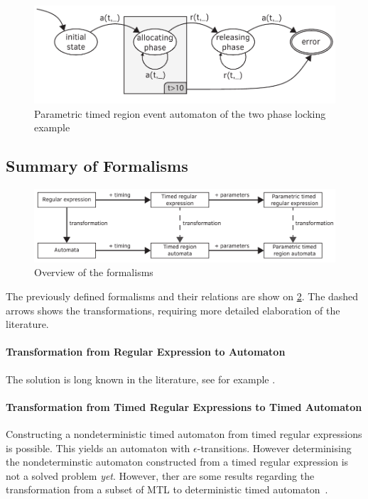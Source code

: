 			\begin{figure}[h]
			\centering
			\includegraphics[width=0.7\linewidth]{figures/chapter_4/allocating_timed_parametric}
			\caption{Parametric timed region event automaton of the two phase locking example \redraw}
			\label{fig:cep:ptrea}
			\end{figure}

	\subsection{Summary of Formalisms}

	\begin{figure}[h]
	\centering
	\includegraphics[width=0.95\linewidth]{figures/chapter_4/folyamatabra}
	\caption{Overview of the formalisms \redraw}
	\label{fig:cep:folyamatabra}
	\end{figure}

	The previously defined formalisms and their relations are show on \cref{fig:cep:folyamatabra}.
	The dashed arrows shows the transformations, requiring more detailed elaboration of the literature.

	\paragraph{Transformation from Regular Expression to Automaton}
	The solution is long known in the literature, see for example \citep{lam2006compilers}.

	\paragraph{Transformation from Timed Regular Expressions to Timed Automaton}
	Constructing a nondeterministic timed automaton from timed regular expressions is possible. This yields an automaton with $\epsilon$-transitions. However determinising the nondeterminstic automaton constructed from a timed regular expression is not a solved problem \emph{yet}. However, ther are some results regarding the transformation from a subset of MTL to deterministic timed automaton~\citep{nivckovic2010mtl}.

